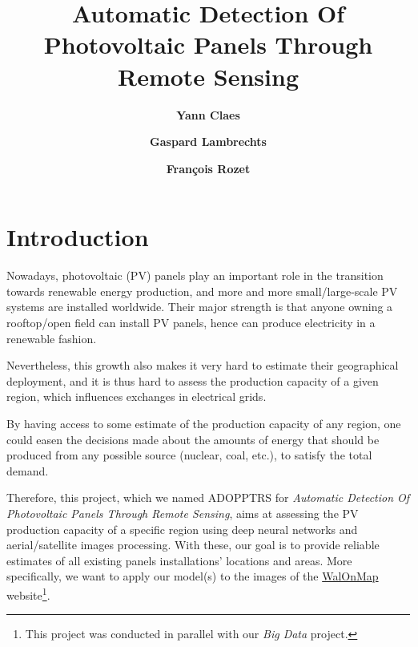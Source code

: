 \documentclass[twocolumn,superscriptaddress,aps,nofootinbib]{revtex4-1}
\begin{document}

\title{\Large{Automatic Detection Of Photovoltaic Panels Through Remote Sensing}}
\vspace{1cm}
\author{\small{\bf Yann Claes}}
\author{\small{\bf Gaspard Lambrechts}}
\author{\small{\bf François Rozet}}
\maketitle


\section{Introduction}
Nowadays, photovoltaic (PV) panels play an important role in the transition towards renewable energy production, and more and more small/large-scale PV systems are installed worldwide. Their major strength is that anyone owning a rooftop/open field can install PV panels, hence can produce electricity in a renewable fashion.

Nevertheless, this growth also makes it very hard to estimate their geographical deployment, and it is thus hard to assess the production capacity of a given region, which influences exchanges in electrical grids.

By having access to some estimate of the production capacity of any region, one could easen the decisions made about the amounts of energy that should be produced from any possible source (nuclear, coal, etc.), to satisfy the total demand.

Therefore, this project, which we named ADOPPTRS for \emph{Automatic Detection Of Photovoltaic Panels Through Remote Sensing}, aims at assessing the PV production capacity of a specific region using deep neural networks and aerial/satellite images processing. With these, our goal is to provide reliable estimates of all existing panels installations' locations and areas. More specifically, we want to apply our model(s) to the images of the \href{https://geoportail.wallonie.be/walonmap}{WalOnMap} website\footnote{This project was conducted in parallel with our \emph{Big Data} project.}.
\end{document}
